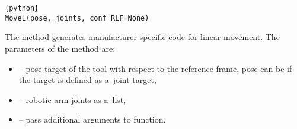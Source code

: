 
\begin{comment}
\begin{lstlisting}[frame=lines,numbers=none,breaklines=true]{python}
class samplepost.RobotPost(robotpost=None, robotname=None, robot_axes=6, **kwargs)
\end{lstlisting}

The \inline{RobotPost} class initializes the robot post processor object. 
The parameters of the \inline{RobotPost} class are:

\begin{itemize}

\item \inline{robotpost (string)} -- name of the post processor linked to the preprocessed file,

\item \inline{robotname(string)} -- the name of the robotic arm,

\item \inline{robot_axes(string list)} -- type and quantity of robotic arm axes,

\item \inline{**kwargs} -- pass additional arguments to function.

\end{itemize}

All subsequent functions are called upon the \inline{RobotPost} object. The most important method is the \inline{MoveL} function:

\end{comment}
\begin{lstlisting}[frame=lines,numbers=none,breaklines=true]{python}
MoveL(pose, joints, conf_RLF=None)
\end{lstlisting}
The  method generates manufacturer-specific code for linear movement. 
The parameters of the  method are:

\begin{itemize}

\item {} -- pose target of the tool with respect to the reference frame, pose can be  if the target is defined as a~joint target,

\item {} -- robotic arm joints as a~list,

\item {} -- pass additional arguments to function. 

\end{itemize}



